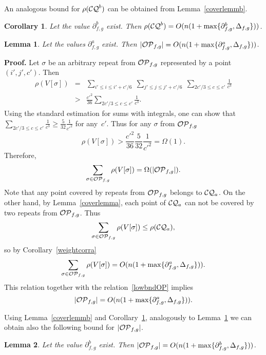 \documentclass{article}
\newtheorem{corollary}{Corollary}
\newtheorem{lemma}{Lemma}
\begin{document}
An analogous bound for $\rho ({\cal CQ}^b)$ can be obtained from Lemma~\ref{coverlemmb}.

\begin{corollary}
Let the value $\partial^b_{f, g}$ exist. Then 
$\rho ({\cal CQ}^b)=O(n(1+\max\{\partial^b_{f, g}, \Delta_{f, g}\}))$.
\label{weightcorrb}
\end{corollary}

\begin{lemma}
Let the values $\partial^a_{f, g}$ exist. Then 
$|{\cal OP}_{f, g}|=O(n(1+\max\{\partial^a_{f, g}, \Delta_{f, g}\}))$.
\label{OPlemma}
\end{lemma}

{\bf Proof.} Let $\sigma$ be an arbitrary repeat from ${\cal OP}_{f, g}$ represented by a point 
$(i', j', c')$. Then
\begin{eqnarray*}
\rho (V[\sigma ])&=&\sum_{i'\le i\le i'+c'/6}\;\sum_{j'\le j\le j'+c'/6}\;\sum_{2c'/3\le c\le c'}\frac{1}{c^3}\\
&>&\frac{c'^2}{36}\sum_{2c'/3\le c\le c'}\frac{1}{c^3}.
\end{eqnarray*}
Using the standard estimation for sums with integrals, one can show that 
$\sum_{2c'/3\le c\le c'}\frac{1}{c^3}\ge \frac{5}{32}\frac{1}{c'^2}$ for any~$c'$.
Thus for any $\sigma$ from ${\cal OP}_{f, g}$
$$
\rho (V[\sigma ])>\frac{c'^2}{36}\frac{5}{32}\frac{1}{c'^2}=\Omega (1).
$$
Therefore,
\begin{equation}
\sum_{\sigma\in {\cal OP}_{f, g}}\rho (V[\sigma ])=\Omega (|{\cal OP}_{f, g}|).
\label{lowbndOP}
\end{equation}
Note that any point covered by repeats from ${\cal OP}_{f, g}$ belongs to ${\cal CQ}_a$.
On the other hand, by Lemma~\ref{coverlemma}, each point of ${\cal CQ}_a$ can not be covered 
by two repeats from ${\cal OP}_{f, g}$. Thus
$$
\sum_{\sigma\in {\cal OP}_{f, g}}\rho (V[\sigma ])\le \rho ({\cal CQ}_a),
$$
so by Corollary~\ref{weightcorra}
$$
\sum_{\sigma\in {\cal OP}_{f, g}}\rho (V[\sigma ])=O(n(1+\max\{\partial^a_{f, g}, \Delta_{f, g}\})).
$$
This relation together with the relation~\ref{lowbndOP} implies 
$$
|{\cal OP}_{f, g}|=O(n(1+\max\{\partial^a_{f, g}, \Delta_{f, g}\})).
$$

Using Lemma~\ref{coverlemmb} and Corollary~\ref{weightcorrb}, analogously to Lemma~\ref{OPlemma} we can 
obtain also the following bound for $|{\cal OP}_{f, g}|$.
\begin{lemma}
Let the value $\partial^b_{f, g}$ exist. Then
$|{\cal OP}_{f, g}|=O(n(1+\max\{\partial^b_{f, g}, \Delta_{f, g}\}))$.
\label{OPlemmb}
\end{lemma}
\end{document}
